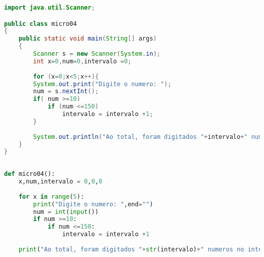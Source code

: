 \documentclass[hidelinks,12pt]{article}
\begin{document}
	\begin{lstlisting}[caption=Código em Java,language=java]
import java.util.Scanner;

public class micro04
{
	public static void main(String[] args)
	{
		Scanner s = new Scanner(System.in);
		int x=0,num=0,intervalo =0;
		
		for (x=0;x<5;x++){
		System.out.print("Digite o numero: ");
		num = s.nextInt();
		if( num >=10)
			if (num <=150)
				intervalo = intervalo +1;
		}
		
		System.out.println("Ao total, foram digitados "+intervalo+" numeros no intervalo entre 10 e 150");
	}
}	
	
	\end{lstlisting}
	
	\begin{lstlisting}[caption=Código em python,language=Python]
def micro04():
	x,num,intervalo = 0,0,0
	
	for x in range(5):
		print("Digite o numero: ",end="")
		num = int(input())
		if num >=10:
			if num <=150:
				intervalo = intervalo +1
	
	print("Ao total, foram digitados "+str(intervalo)+" numeros no intervalo entre 10 e 150")	
	
	\end{lstlisting}
	
\end{document}
